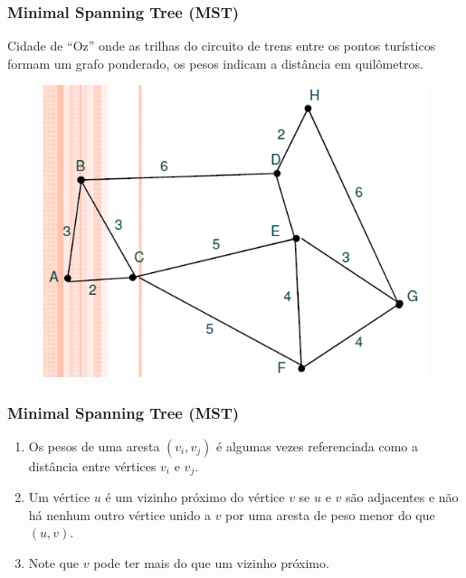 \documentclass[hyperref={pdfpagelabels=false}]{beamer}
\begin{document}
\begin{frame}
\frametitle{Minimal Spanning Tree (MST)}

Cidade de “Oz” onde as trilhas do circuito de trens entre os pontos turísticos formam um grafo ponderado, os pesos indicam a distância em quilômetros.

\begin{figure}[!h]
	\centering
	\includegraphics[scale=0.4]{07}
	\label{07}
\end{figure}

\end{frame}

\begin{frame}
\frametitle{Minimal Spanning Tree (MST)}
\begin{enumerate}
	\item Os pesos de uma aresta $(v_i, v_j)$ é algumas vezes referenciada como a distância entre vértices $v_i$ e $v_j$.
	\item Um vértice $u$ é um vizinho próximo do vértice $v$ se $u$ e $v$ são adjacentes e não há nenhum outro vértice unido a $v$ por uma aresta de peso menor do que $(u,v)$.
	\item Note que $v$ pode ter mais do que um vizinho próximo.
\end{enumerate}
\end{frame}
\end{document}

